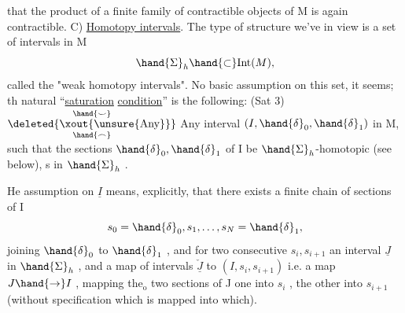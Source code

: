 that the product of a finite family of contractible objects of M is again
contractible.
 C)  \uline{Homotopy intervals}.  The type  of structure we've in view is a
set  of intervals in M
\[ \hand{\Sigma}_h \hand{\subset} \mathrm{Int}(M), \]
called the "weak homotopy intervals". No basic assumption on this set,
it seems;  th natural ``\uline{saturation} \uline{condition}'' is the following:
(Sat 3)  $\overset{\hand{\smile}}{\underset{\hand{\frown}}{\text{\deleted{\xout{\unsure{Any}}}}}}$ Any interval  $(I,\hand{\delta}_0,\hand{\delta}_1)$ in M,  such that the sections $\hand{\delta}_0,\hand{\delta}_1$
of I be $\hand{\Sigma}_h$-homotopic (see below),  s in $\hand{\Sigma}_h$ .

He assumption on $\underline{I}$ means,  explicitly,  that there exists a finite
chain of sections of I
\[ s_0=\hand{\delta}_0, s_1, \ldots , s_N=\hand{\delta}_1 , \]
joining $\hand{\delta}_0$ to $\hand{\delta}_1$ ,  and for two consecutive  $s_i, s_{i+1}$  an interval
$\underline{J}$ in $\hand{\Sigma}_h$ ,  and a  map of intervals  $\check{\underline{J}}$ to $(I,s_i,s_{i+1})$  i.e. a map
$J \hand{\to} I$ ,  mapping the\ensuremath{{}_{\mathrm o}} two   sections of J  one into $s_i$ , the other
into $s_{i+1}$ (without specification which is mapped into which).

